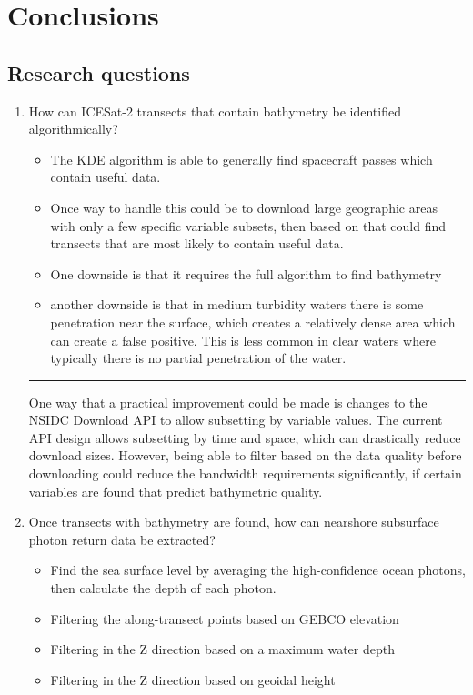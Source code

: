 \chapter{Conclusions}
\section{Research questions}
\begin{enumerate}
    \item How can ICESat-2 transects that contain bathymetry be identified algorithmically?
    

    \begin{itemize}
        \item The KDE algorithm is able to generally find spacecraft passes which contain useful data.
        \item Once way to handle this could be to download large geographic areas with only a few specific variable subsets, then based on that could find transects that are most likely to contain useful data.
        \item One downside is that it requires the full algorithm to find bathymetry
        \item another downside is that in medium turbidity waters there is some penetration near the surface, which creates a relatively dense area which can create a false positive. This is less common in clear waters where typically there is no partial penetration of the water. 
    \end{itemize}
    \rule{\paperwidth}{0.4pt}
    
    One way that a practical improvement could be made is changes to the NSIDC Download API to allow subsetting by variable values. The current API design allows subsetting by time and space, which can drastically reduce download sizes. However, being able to filter based on the data quality before downloading could reduce the bandwidth requirements significantly, if certain variables are found that predict bathymetric quality. 
    
    \item Once transects with bathymetry are found, how can nearshore subsurface photon return data be extracted?
    
    \begin{itemize}
        \item Find the sea surface level by averaging the high-confidence ocean photons, then calculate the depth of each photon.
        \item Filtering the along-transect points based on GEBCO elevation
        \item Filtering in the Z direction based on a maximum water depth
        \item Filtering in the Z direction based on geoidal height
        

\end{itemize}
\end{enumerate}
